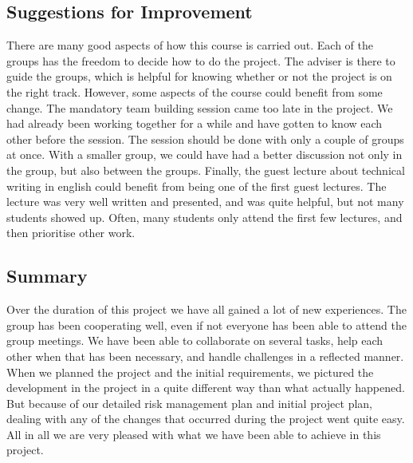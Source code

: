 \documentclass[../document]{subfiles}
\begin{document}
\subsection{Suggestions for Improvement}
There are many good aspects of how this course is carried out. Each of the groups has the freedom to decide how to do the project. The adviser is there to guide the groups, which is helpful for knowing whether or not the project is on the right track. However, some aspects of the course could benefit from some change. The mandatory team building session came too late in the project. We had already been working together for a while and have gotten to know each other before the session. The session should be done with only a couple of groups at once. With a smaller group, we could have had a better discussion not only in the group, but also between the groups. Finally, the guest lecture about technical writing in english could benefit from being one of the first guest lectures. The lecture was very well written and presented, and was quite helpful, but not many students showed up. Often, many students only attend the first few lectures, and then prioritise other work.

\subsection{Summary}
Over the duration of this project we have all gained a lot of new experiences. The group has been cooperating well, even if not everyone has been able to attend the group meetings. We have been able to collaborate on several tasks, help each other when that has been necessary, and handle challenges in a reflected manner. When we planned the project and the initial requirements, we pictured the development in the project in a quite different way than what actually happened. But because of our detailed risk management plan and initial project plan, dealing with any of the changes that occurred during the project went quite easy. All in all we are very pleased with what we have been able to achieve in this project.
\end{document}
